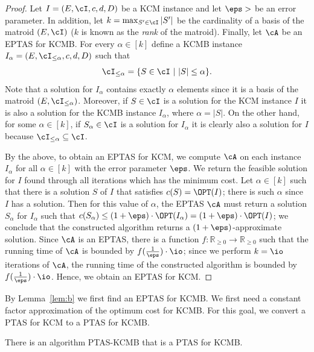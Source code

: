 \begin{proof}
	Let $I =  (E,\cI,c,d,D)$ be a KCM instance and let $\eps>$ be an error parameter. %
	In addition, let $k = \max_{S' \in \cI} |S'|$ be the cardinality of a basis of the matroid $(E,\cI)$ ($k$ is known as the {\em rank} of the matroid). Finally, let $\cA$ be an EPTAS for KCMB. For every $\alpha \in [k]$ define a KCMB instance $I_{\alpha} = (E,\cI_{\leq \alpha},c,d,D)$ such that $$\cI_{\leq \alpha} = \{S \in \cI~|~|S| \leq \alpha\}.$$ 
	Note that a solution for $I_{\alpha}$ contains exactly $\alpha$ elements since it is a basis of the matroid $(E,\cI_{\leq \alpha})$. Moreover, if $S \in \cI$ is a solution for the KCM instance $I$ it is also a solution for the KCMB instance $I_{\alpha}$, where $\alpha = |S|$. 
	On the other hand, for some $\alpha \in [k]$, if $S_{\alpha} \in \cI$ is a solution for $I_{\alpha}$ it is clearly also a solution for $I$ because $\cI_{\leq \alpha} \subseteq \cI$.  
	
	By the above, to obtain an EPTAS for KCM, we compute $\cA$ on each instance $I_{\alpha}$ for all $\alpha \in [k]$ with the error parameter $\eps$. We return the feasible solution for $I$ found through all iterations which has the minimum cost. Let $\alpha \in [k]$ such that there is a solution $S$ of $I$ that satisfies $c(S) = \OPT(I)$; there is such $\alpha$ since $I$ has a solution. Then for this value of $\alpha$, the EPTAS $\cA$ must return a solution $S_{\alpha}$ for $I_{\alpha}$ such that $c(S_{\alpha}) \leq (1+\eps) \cdot \OPT(I_{\alpha}) = (1+\eps) \cdot \OPT(I)$; we conclude that the constructed algorithm returns a $(1+\eps)$-approximate solution. Since $\cA$ is an EPTAS, there is a function $f:\mathbb{R}_{\geq 0} \rightarrow \mathbb{R}_{\geq 0}$ such that the running time of $\cA$ is bounded by $f(\frac{1}{\eps}) \cdot \io$; since we perform $k = \io$ iterations of $\cA$, the running time of the constructed algorithm is bounded by $f(\frac{1}{\eps}) \cdot \io$. Hence, we obtain an EPTAS for KCM. 
\end{proof}







By Lemma~\ref{lem:b} we first find an EPTAS for KCMB. %
We first need a constant factor approximation of the optimum cost for KCMB. %
For this goal, we convert a PTAS for KCM to a PTAS for KCMB. \begin{lemma}
	\label{lem:B}
	There is an algorithm \textnormal{PTAS-KCMB} that is a \textnormal{PTAS} for \textnormal{KCMB}.
\end{lemma}

